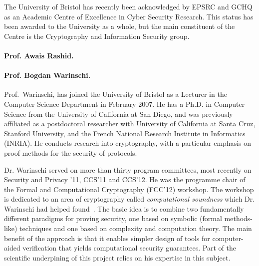 \documentclass[10pt]{article}
\begin{document}
The University of Bristol has recently been acknowledged by 
EPSRC and GCHQ as an Academic Centre of Excellence in Cyber Security
Research. This status has been awarded to the University as a whole,
but the main constituent of the Centre is the Cryptography and Information
Security group.
\fi



\paragraph{Prof. Awais Rashid.}

\vspace{.5cm}


\paragraph{Prof. Bogdan Warinschi.}
Prof.~Warinschi, has joined the University of 
Bristol as a Lecturer in the Computer Science Department in February 2007. 
He has a Ph.D. in Computer Science from the University of California
at San Diego, and was previously affiliated as a postdoctoral researcher with
University of California at Santa Cruz, Stanford University, and the
French National Research Institute in Informatics (INRIA).
He conducts research into cryptography, with a particular emphasis on
proof methods for the security of protocols.


\iffalse
He was a co-investigator on the EP/H043454/1 EPSRC grant on "Privacy and Attestation Technologies" and on the ERC Advanced Grant ERC-2010-AdG-267188-CRIPTO on "Cryptography Research Involving Practical and Theoretical Outlooks". 
He is a co-PI on the FP 7 project ``PRACTICE" (grant agreement 609611).
\fi
Dr. Warinschi served on more than thirty program committees, most recently on Security and Privacy '11, CCS'11 and CCS'12. 
He was the programme chair of the Formal and Computational Cryptography (FCC'12) workshop. 
The workshop is dedicated to an area of cryptography called {\em computational   soundness} which Dr. Warinschi had helped found~\cite{micciancio04completeness,micciancio04soundness,cortier05computationally,abadi05security,abadi05passwordbased,abadi06guessing,datta06computationally,cortier06computationally}.
The basic idea is to combine two fundamentally different paradigms for proving security, one based on symbolic (formal methods-like) techniques and one based on complexity and computation theory. The main benefit of the approach is that it enables simpler design of tools for computer-aided verification that yields computational security guarantees.
Part of the scientific underpining of this project relies on his expertise in this subject. 
\end{document}
